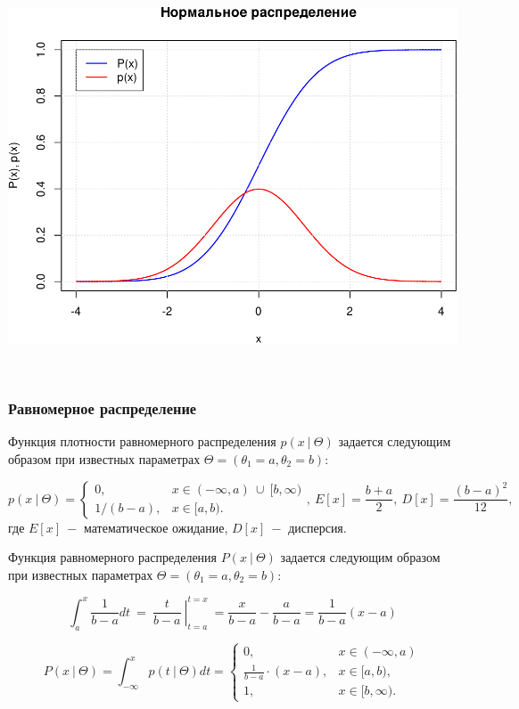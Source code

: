 \documentclass[
  14,
]{article}
\begin{document}
\begin{center}\includegraphics[width=0.75\linewidth]{Prac3_files/figure-latex/unnamed-chunk-2-1} \end{center}

\(\ \)

\hypertarget{ux440ux430ux432ux43dux43eux43cux435ux440ux43dux43eux435-ux440ux430ux441ux43fux440ux435ux434ux435ux43bux435ux43dux438ux435}{%
\subsubsection{\texorpdfstring{\textbf{Равномерное
распределение}}{Равномерное распределение}}\label{ux440ux430ux432ux43dux43eux43cux435ux440ux43dux43eux435-ux440ux430ux441ux43fux440ux435ux434ux435ux43bux435ux43dux438ux435}}

Функция плотности равномерного распределения \(p(x\ | \ \Theta)\)
задается следующим образом при известных параметрах
\(\Theta = (\theta_1 = a, \theta_2 = b)\):

\[
p(x\ | \ \Theta) = \left\{\begin{matrix} 0, & x\in (-\infty, a)\ \cup\ [b, \infty)  \\
1/(b - a), & x\in [a, b).\end{matrix}\right. , \ E[x] = \frac{b+a}{2}, \ D[x] = \frac{(b-a)^2}{12},
\] где \(E[x]\ -\) математическое ожидание, \(D[x] \ -\) дисперсия.

Функция равномерного распределения \(P(x\ |\ \Theta)\) задается
следующим образом при известных параметрах
\(\Theta = (\theta_1 = a, \theta_2 = b)\):

\[
\int_{a}^{x} \frac{1}{b-a} dt\ = \left.\ \frac{t}{b-a}\ \right|_{t=a}^{t=x}\ = \frac{x}{b-a} - \frac{a}{b-a} = \frac{1}{b-a} (x - a) 
\]

\[
P(x\ |\ \Theta) = \int_{-\infty}^{x} p(t\ |\ \Theta) dt = \left\{
\begin{matrix} 
0, & x\in (-\infty, a)  \\
\frac{1}{b - a} \cdot (x-a) , & x \in [a, b),\\
1, & x \in [b, \infty).  
\end{matrix}
\right.
\]
\end{document}
